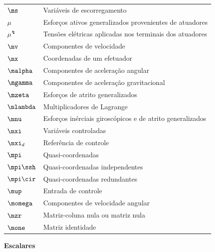 \documentclass[]{politex}
\begin{document}
\begin{longtable}{lp{}}
  $\ms$ & Variáveis de escorregamento \\
  $\mu$ & Esforços ativos generalizados provenientes de atuadores \\
  $\mu^\lightning$ & Tensões elétricas aplicadas nos terminais dos atuadores  \\
  $\mv$ & Componentes de velocidade \\
  $\mx$ & Coordenadas de um efetuador \\
  $\malpha$ & Componentes de aceleração angular \\
  $\mgamma$ & Componentes de aceleração gravitacional \\
  $\mzeta$ & Esforços de atrito generalizados \\
  $\mlambda$ & Multiplicadores de Lagrange \\
  $\mnu$ & Esforços inérciais giroscópicos e de atrito generalizados \\
  $\mxi$ & Variáveis controladas \\
  $\mxi_d$ & Referência de controle \\
  $\mpi$ & Quasi-coordenadas \\
  $\mpi\ssh$ & Quasi-coordenadas independentes \\
  $\mpi\cir$ & Quasi-coordenadas redundantes\\
  $\mup$ & Entrada de controle \\
  $\momega$ & Componentes de velocidade angular \\
  $\mzr$ & Matriz-coluna nula ou matriz nula \\
  $\mone$ & Matriz identidade \\
\end{longtable}
\begin{center} \begin{Large} \textbf{Escalares} \end{Large} \end{center}
\end{document}
